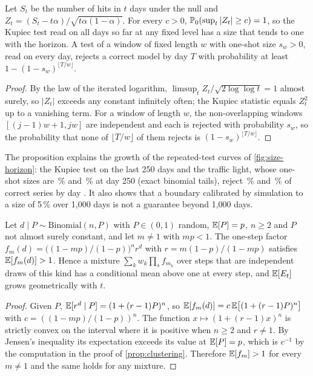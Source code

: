 \begin{proposition}
\label{prop:repeated}
Let $S_t$ be the number of hits in $t$ days under the null and $Z_t=(S_t-t\alpha)/\sqrt{t\alpha(1-\alpha)}$. For every $c>0$, $\mathbb{P}_0(\sup_t|Z_t|\ge c)=1$, so the Kupiec test read on all days so far at any fixed level has a size that tends to one with the horizon. A test of a window of fixed length $w$ with one-shot size $s_w>0$, read on every day, rejects a correct model by day $T$ with probability at least
$1-(1-s_w)^{\lfloor T/w\rfloor}$.
\end{proposition}
\begin{proof}
By the law of the iterated logarithm, $\limsup_tZ_t/\sqrt{2\log\log t}=1$ almost surely, so $|Z_t|$ exceeds any constant infinitely often; the Kupiec statistic equals $Z_t^2$ up to a vanishing term. For a window of length $w$, the non-overlapping windows $[(j-1)w+1,jw]$ are independent and each is rejected with probability $s_w$, so the probability that none of $\lfloor T/w\rfloor$ of them rejects is $(1-s_w)^{\lfloor T/w\rfloor}$.
\end{proof}

The proposition explains the growth of the repeated-test curves of \cref{fig:size-horizon}: the Kupiec test on the last 250 days and the traffic light, whose one-shot sizes are \nExactOneShotKup\,\% and \nExactOneShotLight\,\% at day 250 (exact binomial tails), reject \nHorizonEndKupTrail\,\% and \nHorizonEndLight\,\% of correct series by day \nHorizonDays.
It also shows that a boundary calibrated by simulation to a size of 5\,\% over 1,000 days is not a guarantee beyond 1,000 days.

\begin{proposition}
\label{prop:overdispersion}
Let $d\mid P\sim\mathrm{Binomial}(n,P)$ with $P\in(0,1)$ random, $\mathbb{E}[P]=p$, $n\ge2$ and $P$ not almost surely constant, and let $m\ne1$ with $mp<1$. The one-step factor $f_m(d)=\bigl((1-mp)/(1-p)\bigr)^{n}r^{d}$ with $r=m(1-p)/(1-mp)$ satisfies $\mathbb{E}[f_m(d)]>1$. Hence a mixture $\sum_kw_k\prod_sf_{m_k}$ over steps that are independent draws of this kind has a conditional mean above one at every step, and
$\mathbb{E}[E_t]$ grows geometrically with $t$.
\end{proposition}
\begin{proof}
Given $P$, $\mathbb{E}[r^d\mid P]=(1+(r-1)P)^n$, so $\mathbb{E}[f_m(d)]=c\,\mathbb{E}\bigl[(1+(r-1)P)^n\bigr]$ with $c=((1-mp)/(1-p))^n$. The function $x\mapsto(1+(r-1)x)^n$ is strictly convex on the interval where it is positive when $n\ge2$ and $r\ne1$. By Jensen's inequality its expectation exceeds its value at $\mathbb{E}[P]=p$, which is $c^{-1}$ by the computation in the proof of \cref{prop:clustering}. Therefore $\mathbb{E}[f_m]>1$ for every $m\ne1$ and the same holds for any mixture.
\end{proof}

